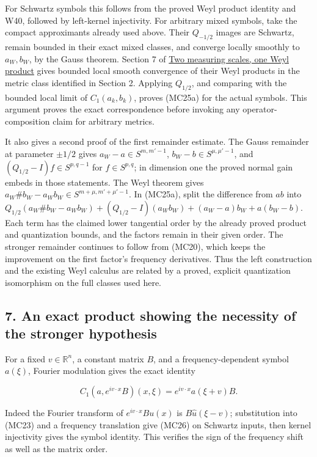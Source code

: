 \documentclass[
  11pt,
]{article}
\begin{document}
For Schwartz symbols this follows from the proved Weyl product identity
and W40, followed by left-kernel injectivity. For arbitrary mixed
symbols, take the compact approximants already used above. Their
\(Q_{-1/2}\) images are Schwartz, remain bounded in their exact mixed
classes, and converge locally smoothly to \(a_W,b_W\), by the Gauss
theorem. Section 7 of \href{weyl-metric-products.pdf}{Two measuring
scales, one Weyl product} gives bounded local smooth convergence of
their Weyl products in the metric class identified in Section 2.
Applying \(Q_{1/2}\), and comparing with the bounded local limit of
\(C_1(a_k,b_k)\), proves (MC25a) for the actual symbols. This argument
proves the exact correspondence before invoking any operator-composition
claim for arbitrary metrics.

It also gives a second proof of the first remainder estimate. The Gauss
remainder at parameter \(\pm1/2\) gives \(a_W-a\in S^{m,m'-1}\),
\(b_W-b\in S^{\mu,\mu'-1}\), and \((Q_{1/2}-I)f\in S^{p,q-1}\) for
\(f\in S^{p,q}\); in dimension one the proved normal gain embeds in
those statements. The Weyl theorem gives
\(a_W\#b_W-a_Wb_W\in S^{m+\mu,m'+\mu'-1}\). In (MC25a), split the
difference from \(ab\) into
\(Q_{1/2}(a_W\#b_W-a_Wb_W)+(Q_{1/2}-I)(a_Wb_W)+(a_W-a)b_W+a(b_W-b)\).
Each term has the claimed lower tangential order by the already proved
product and quantization bounds, and the factors remain in their given
order. The stronger remainder continues to follow from (MC20), which
keeps the improvement on the first factor's frequency derivatives. Thus
the left construction and the existing Weyl calculus are related by a
proved, explicit quantization isomorphism on the full classes used here.

\subsection{7. An exact product showing the necessity of the stronger
hypothesis}\label{an-exact-product-showing-the-necessity-of-the-stronger-hypothesis}

For a fixed \(v\in\mathbb R^n\), a constant matrix \(B\), and a
frequency-dependent symbol \(a(\xi)\), Fourier modulation gives the
exact identity

\[
C_1(a,e^{iv\cdot x}B)(x,\xi)=e^{iv\cdot x}a(\xi+v)B.
\tag{MC26}
\]

Indeed the Fourier transform of \(e^{iv\cdot x}Bu(x)\) is
\(B\widehat u(\xi-v)\); substitution into (MC23) and a frequency
translation give (MC26) on Schwartz inputs, then kernel injectivity
gives the symbol identity. This verifies the sign of the frequency shift
as well as the matrix order.
\end{document}
